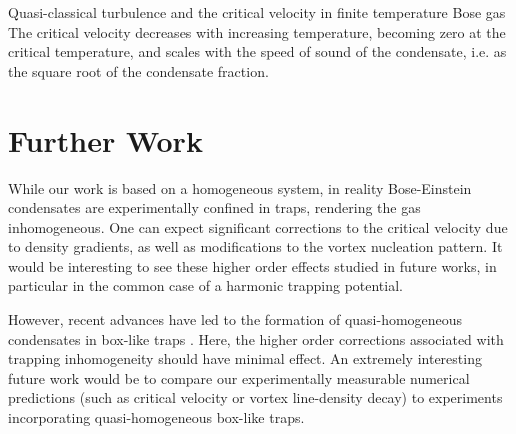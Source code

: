 \begin{chapter}{\label{cha:nonequib}Quasi-classical turbulence and the critical velocity in finite temperature Bose gas}
The critical velocity decreases with increasing temperature, becoming zero at the critical temperature, and scales with the speed of sound of the condensate, i.e. as the square root of the condensate fraction.

\section{Further Work}
While our work is based on a homogeneous system, in reality Bose-Einstein condensates are experimentally confined in traps, rendering the gas inhomogeneous. One can expect significant corrections to the critical velocity due to density gradients, as well as modifications to the vortex nucleation pattern. It would be interesting to see these higher order effects studied in future works, in particular in the common case of a harmonic trapping potential.

However, recent advances have led to the formation of quasi-homogeneous condensates in box-like traps \cite{gaunt_2013,chomaz_2015}. Here, the higher order corrections associated with trapping inhomogeneity should have minimal effect. An extremely interesting future work would be to compare our experimentally measurable numerical predictions (such as critical velocity or vortex line-density decay) to experiments incorporating quasi-homogeneous box-like traps.
\end{chapter}